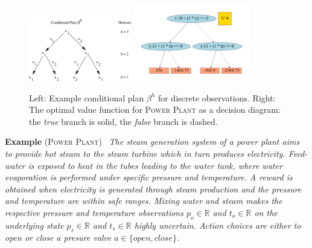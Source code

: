 \documentclass{article} %
\newcommand{\open}{\mathit{open}}
\newcommand{\close}{\mathit{close}}
\begin{document}
\begin{figure}[t!]
\begin{center}
\includegraphics[width=0.4\textwidth]{pics/cond_plan2.pdf}
\includegraphics[width=0.45\textwidth]{pics/b1-4.pdf}
\end{center}
\vspace{-2mm}
\caption{\footnotesize Left: Example conditional plan $\beta^h$ for discrete observations. Right: The optimal value function for \textsc{Power Plant}
as a decision diagram: 
the \emph{true} branch is solid, the \emph{false}
branch is dashed.}
\label{fig:cond_plan}
\vspace{-1mm}
\end{figure}

\textbf{Example} \textsc{(Power Plant)~\cite{steam2}} \emph{The steam
generation system of a power plant aims to provide hot steam to the
steam turbine which in turn produces electricity. Feed-water is
exposed to heat in the tubes leading to the water tank, where water
evaporation is performed under specific pressure and temperature.
A reward is obtained when electricity is generated through steam
production and the pressure and temperature are within safe ranges.
Mixing water and steam makes the
respective pressure and temperature observations $p_o \in \mathbb{R}$
and $t_o \in \mathbb{R}$ on the underlying state $p_s \in \mathbb{R}$
and $t_s \in \mathbb{R}$ highly uncertain.  Action choices are either
to open or close a presure valve $a \in \{ \open, \close \}$.}
\end{document}
